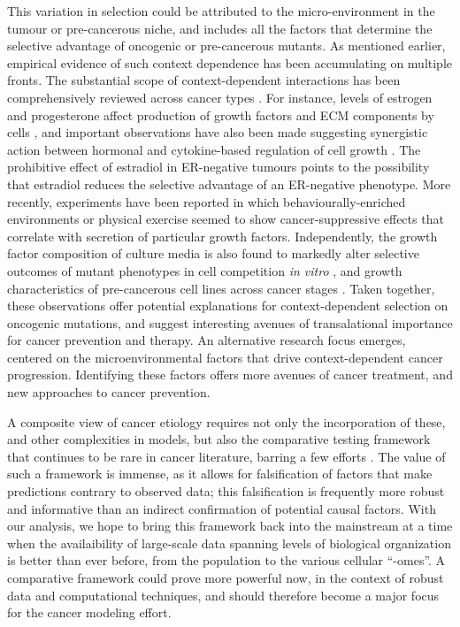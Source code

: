 \documentclass[9pt,onecolumn,twoside]{pnas-new}
\begin{document}
This variation in selection could be attributed to the micro-environment in the tumour or pre-cancerous niche, and includes all the factors that determine the selective advantage of oncogenic or pre-cancerous mutants. As mentioned earlier, empirical evidence of such context dependence has been accumulating on multiple fronts. The substantial scope of context-dependent interactions has been comprehensively reviewed across cancer types \cite{Hansen2000,Pietras2010,Hanahan2012,Cabarcas2011a}. For instance, levels of estrogen and progesterone affect production of growth factors and ECM components by cells \cite{Haslam2001,Woodward2000,DICKSON1987}, and important observations have also been made suggesting synergistic action between hormonal and cytokine-based regulation of cell growth \cite{Freund2003}. The prohibitive effect of estradiol in ER-negative tumours \cite{Garcia1992} points to the possibility that estradiol reduces the selective advantage of an ER-negative phenotype. More recently, experiments have been reported in which behaviourally-enriched environments or physical exercise seemed to show cancer-suppressive effects \cite{Cao2010,Rundqvist2013} that correlate with secretion of particular growth factors. Independently, the growth factor composition of culture media is also found to markedly alter selective outcomes of mutant phenotypes in cell competition \textit{in vitro} \cite{Archetti2015}, and growth characteristics of pre-cancerous cell lines across cancer stages \cite{Chan2014}. Taken together, these observations offer potential explanations for context-dependent selection on oncogenic mutations, and suggest interesting avenues of transalational importance for cancer prevention and therapy. An alternative research focus emerges, centered on the microenvironmental factors that drive context-dependent cancer progression. Identifying these factors offers more avenues of cancer treatment, and new approaches to cancer prevention.

A composite view of cancer etiology requires not only the incorporation of these, and other complexities in models, but also the comparative testing framework that continues to be rare in cancer literature, barring a few efforts \cite{Frank2007}. The value of such a framework is immense, as it allows for falsification of factors that make predictions contrary to observed data; this falsification is frequently more robust and informative than an indirect confirmation of potential causal factors. With our analysis, we hope to bring this framework back into the mainstream at a time when the availaibility of large-scale data spanning levels of biological organization is better than ever before, from the population to the various cellular ``-omes''. A comparative framework could prove more powerful now, in the context of robust data and computational techniques, and should therefore become a major focus for the cancer modeling effort.
\end{document}
